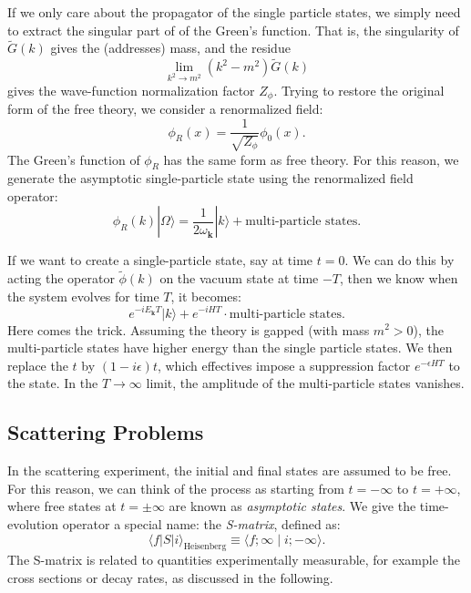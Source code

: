 \documentclass[aps,prb,superscriptaddress,nofootinbib]{revtex4}
\begin{document}
If we only care about the propagator of the single particle states, we simply need to extract the singular part of of the Green's function.
That is, the singularity of $\tilde{G}(k)$ gives the (addresses) mass, and the residue 
\begin{equation*}
	\lim_{k^2 \rightarrow m^2} (k^2-m^2)\tilde{G}(k)
\end{equation*}
gives the wave-function normalization factor $Z_\phi$.
Trying to restore the original form of the free theory, we consider a renormalized field:
\begin{equation}
	\phi_R(x) = \frac{1}{\sqrt{Z_\phi}}\phi_0(x).
\end{equation}
The Green's function of $\phi_R$ has the same form as free theory.
For this reason, we generate the asymptotic single-particle state using the renormalized field operator:
\begin{equation}\label{eq:scalar-field-generate-particle}
	\phi_R(k)|\Omega\rangle = \frac{1}{2\omega_{\bm k}}|k\rangle + \text{multi-particle states}.
\end{equation}

If we want to create a single-particle state, say at time $t=0$.
We can do this by acting the operator $\tilde{\phi}(k)$ on the vacuum state at time $-T$, then we know when the system evolves for time $T$, it becomes:
\begin{equation}
	e^{-i E_{\bm k} T}|k\rangle + e^{-iHT} \cdot \text{multi-particle states}.
\end{equation}
Here comes the trick.
Assuming the theory is gapped (with mass $m^2>0$), the multi-particle states have higher energy than the single particle states.
We then replace the $t$ by $(1-i\epsilon)t$, which effectives impose a suppression factor $e^{-\epsilon H T}$ to the state.
In the $T\rightarrow \infty$ limit, the amplitude of the multi-particle states vanishes.

\subsection{Scattering Problems}

In the scattering experiment, the initial and final states are assumed to be free.
For this reason, we can think of the process as starting from $t=-\infty$ to $t=+\infty$, where free states at $t=\pm \infty$ are known as \textit{asymptotic states}.
We give the time-evolution operator a special name: the \textit{S-matrix}, defined as:
\begin{equation}
	\langle f|S| i\rangle_{\text{Heisenberg}} \equiv \langle f ; \infty \mid i ;-\infty\rangle.
\end{equation}
The S-matrix is related to quantities experimentally measurable, for example the cross sections or decay rates, as discussed in the following.
\end{document}

